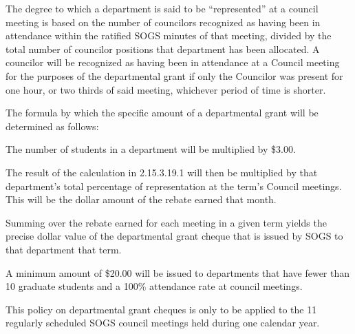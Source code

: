 \begin{longenum}[ label*=\thesubsection.\arabic*., align=left]
    \item The degree to which a department is said to be ``represented'' at a council meeting is based on the number of councilors recognized as having been in attendance within the ratified SOGS minutes of that meeting, divided by the total number of councilor positions that department has been allocated. A councilor will be recognized as having been in attendance at a Council meeting for the purposes of the departmental grant if only the Councilor was present for one hour, or two thirds of said meeting, whichever period of time is shorter.
    \item The formula by which the specific amount of a departmental grant will be determined as follows:
	\begin{longenum}[ label*=\arabic*., align=left]
		\item The number of students in a department will be multiplied by \$3.00. 		
        \item The result of the calculation in 2.15.3.19.1 will then be multiplied by that department's total percentage of representation at the term's Council meetings. This will be the dollar amount of the rebate earned that month.      
        \item Summing over the rebate earned for each meeting in a given term yields the precise dollar value of the departmental grant cheque that is issued by SOGS to that department that term.
    \end{longenum} 
    \item A minimum amount of \$20.00 will be issued to departments that have fewer than 10 graduate students and a 100\% attendance rate at council meetings.
    \item This policy on departmental grant cheques is only to be applied to the 11 regularly scheduled SOGS council meetings held during one calendar year.
\end{longenum}
